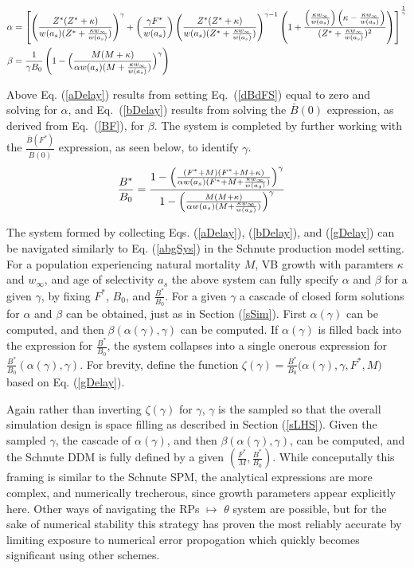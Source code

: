 %
\begingroup
\scriptsize
\begin{align}
\alpha & = \left[ \oneA + \twoA \left( 1 + \thrA \right) \right]^{\frac{1}{\gamma}} \label{aDelay}\\
\beta &= \frac{1}{\gamma B_0} \left( 1 - \Big(\frac{M (M + \kappa)}{\alpha w(a_s)(M + \kr)}\Big)^\gamma\right) \label{bDelay}%
\end{align}
\endgroup

%
Above Eq. (\ref{aDelay}) results from setting \mbox{Eq. (\ref{dBdFS})} equal to zero
and solving for $\alpha$, and \mbox{Eq. (\ref{bDelay})} results from solving the
$\bar{B}(0)$ expression, as derived from \mbox{Eq. (\ref{BF}),} for $\beta$. The system
is completed by further working with the $\frac{\bar{B}(F^*)}{\bar{B}(0)}$ expression,
as seen below, to identify $\gamma$.
\begin{align}
\frac{B^*}{B_0} &= \frac{ 1 - \Big(\frac{(F^* + M) (F^* + M + \kappa)}{\alpha w(a_s)(F^* + M + \frac{\kappa w_\infty}{w(a_s)})}\Big)^\gamma }{ 1 - \Big(\frac{M (M + \kappa)}{\alpha w(a_s)(M + \frac{\kappa w_\infty}{w(a_s)})}\Big)^\gamma }
\label{gDelay}
\end{align}

%
The system formed by collecting Eqs. (\ref{aDelay}), (\ref{bDelay}), and 
(\ref{gDelay}) can be navigated similarly to Eq. (\ref{abgSys}) in the Schnute 
production model setting. For a population experiencing natural mortality $M$, 
VB growth with paramters $\kappa$ and $w_\infty$, and age of selectivity $a_s$ 
the above system can fully specify $\alpha$ and $\beta$ for a given $\gamma$, 
by fixing $F^*$, $B_0$, and $\frac{B^*}{B_0}$. For a given $\gamma$ a cascade 
of closed form solutions for $\alpha$ and $\beta$ can be obtained, just as in 
Section (\ref{sSim}). 
%
First $\alpha(\gamma)$ can be computed, and then $\beta(\alpha(\gamma), \gamma)$ 
can be computed. If $\alpha(\gamma)$ is filled back into the expression for 
$\frac{B^*}{B_0}$, the system collapses into a single onerous expression for 
$\frac{B^*}{B_0}(\alpha(\gamma), \gamma)$. For brevity, define the function 
\mbox{$\zeta(\gamma)=\frac{B^*}{B_0}\big(\alpha(\gamma), \gamma, F^*, M\big)$} 
based on Eq. (\ref{gDelay}).

%
Again rather than inverting $\zeta(\gamma)$ for $\gamma$, $\gamma$ is the
sampled so that the overall simulation design is space filling as described in
Section (\ref{sLHS}). Given the sampled $\gamma$, the cascade of $\alpha(\gamma)$, 
and then $\beta(\alpha(\gamma), \gamma)$, can be computed, and the Schnute DDM 
is fully defined by a given $(\frac{F^*}{M}, \frac{B^*}{B_0})$.
%
While conceputally this framing is similar to the Schnute SPM,
the analytical expressions are more complex, and numerically trecherous, since
growth parameters appear explicitly here. Other ways of navigating the RPs $\mapsto$ $\theta$
system are possible, but for the sake of numerical stability this strategy has
proven the most reliably accurate by limiting exposure to numerical error 
propogation which quickly becomes significant using other schemes.

